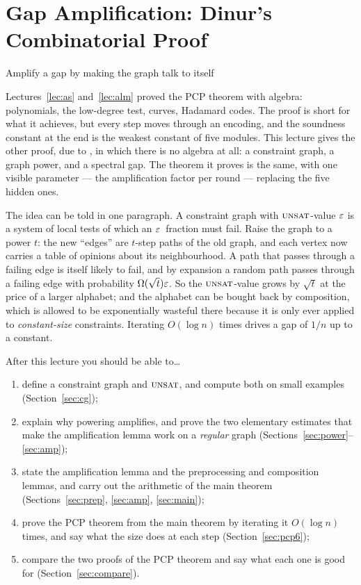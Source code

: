 \chapter{Gap Amplification: Dinur's Combinatorial Proof}
\label{lec:dinur}

{\sffamily\large\color{softgray}Amplify a gap by making the graph talk to itself\par}
\vspace{0.5em}

\noindent
Lectures~\ref{lec:as} and~\ref{lec:alm} proved the PCP theorem with algebra: polynomials, the low-degree test, curves, Hadamard codes.
The proof is short for what it achieves, but every step moves through an encoding, and the soundness constant at the end is the weakest constant of five modules.
This lecture gives the other proof, due to \citet{Dinur07}, in which there is no algebra at all: a constraint graph, a graph power, and a spectral gap.
The theorem it proves is the same, with one visible parameter --- the amplification factor per round --- replacing the five hidden ones.

The idea can be told in one paragraph.  A constraint graph with $\textsc{unsat}$-value $\varepsilon$ is a system of local tests of which an $\varepsilon$~fraction must fail.
Raise the graph to a power $t$: the new ``edges'' are $t$-step paths of the old graph, and each vertex now carries a table of opinions about its neighbourhood.
A path that passes through a failing edge is itself likely to fail, and by expansion a random path passes through a failing edge with probability $\Omega(\sqrt t)\varepsilon$.
So the $\textsc{unsat}$-value grows by $\sqrt t$ at the price of a larger alphabet; and the alphabet can be bought back by composition, which is allowed to be exponentially wasteful there because it is only ever applied to \emph{constant-size} constraints.
Iterating $O(\log n)$ times drives a gap of $1/n$ up to a constant.

\begin{goalbox}{After this lecture you should be able to\ldots}
\begin{enumerate}[leftmargin=*,label=(\arabic*)]
  \item define a constraint graph and $\textsc{unsat}$, and compute both on small examples (Section~\ref{sec:cg});
  \item explain why powering amplifies, and prove the two elementary estimates that make the amplification lemma work on a \emph{regular} graph (Sections~\ref{sec:power}--\ref{sec:amp});
  \item state the amplification lemma and the preprocessing and composition lemmas, and carry out the arithmetic of the main theorem (Sections~\ref{sec:prep}, \ref{sec:amp}, \ref{sec:main});
  \item prove the PCP theorem from the main theorem by iterating it $O(\log n)$ times, and say what the size does at each step (Section~\ref{sec:pcp6});
  \item compare the two proofs of the PCP theorem and say what each one is good for (Section~\ref{sec:compare}).
\end{enumerate}
\end{goalbox}



